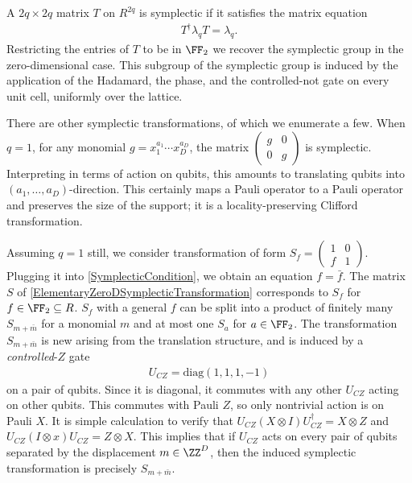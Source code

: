 A $2q \times 2q$ matrix $T$ on $R^{2q}$ is symplectic if it satisfies the matrix equation
\begin{align}
 T^\dagger \lambda_q T = \lambda_q .
\label{SymplecticCondition}
\end{align}
Restricting the entries of $T$ to be in $\FF_2$ we recover the symplectic group in the zero-dimensional case.
This subgroup of the symplectic group is induced by the application of
the Hadamard, the phase, and the controlled-not gate on every unit cell, uniformly over the lattice.

There are other symplectic transformations,
of which we enumerate a few.
When $q=1$,
for any monomial $g=x_1^{a_1} \cdots x_D^{a_D}$, the matrix $ \begin{pmatrix} g & 0 \\ 0 & g  \end{pmatrix}$
is symplectic. Interpreting in terms of action on qubits,
this amounts to translating qubits into $(a_1,\ldots,a_D)$-direction.
This certainly maps a Pauli operator to a Pauli operator and preserves the size of the support;
it is a locality-preserving Clifford transformation.

Assuming $q=1$ still,
we consider transformation of form $S_f = \begin{pmatrix} 1 & 0 \\ f & 1 \end{pmatrix}$.
Plugging it into \eqref{SymplecticCondition}, we obtain an equation $f = \bar f$.
The matrix $S$ of \eqref{ElementaryZeroDSymplecticTransformation} corresponds to 
$S_f$ for $f \in \FF_2 \subseteq R$.
$S_f$ with a general $f$ can be split into a product of 
finitely many $S_{m + \bar m}$ for a monomial $m$ 
and at most one $S_a$ for $a \in \FF_2$.
The transformation $S_{m + \bar m}$ is new arising from the translation structure,
and is induced by a {\em controlled}-$Z$ gate
\begin{align}
 U_{CZ} = \mathrm{diag}( 1,1,1,-1)
\end{align}
on a pair of qubits. Since it is diagonal, it commutes with any other $U_{CZ}$ acting on other qubits.
This commutes with Pauli $Z$, so only nontrivial action is on Pauli $X$.
It is simple calculation to verify that $U_{CZ} (X \otimes I) U_{CZ}^\dagger = X \otimes Z$ and
$U_{CZ} (I \otimes x) U_{CZ} = Z \otimes X$.
This implies that if $U_{CZ}$ acts on every pair of qubits separated by the displacement $m \in \ZZ^D$,
then the induced symplectic transformation is precisely $S_{m + \bar m}$.

